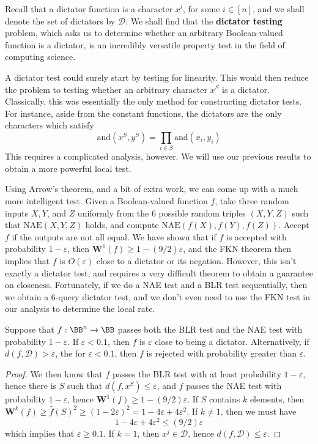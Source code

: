 Recall that a dictator function is a character $x^i$, for some $i \in [n]$, and we shall denote the set of dictators by $\mathcal{D}$. We shall find that the {\bf dictator testing} problem, which asks us to determine whether an arbitrary Boolean-valued function is a dictator, is an incredibly versatile property test in the field of computing science.

A dictator test could surely start by testing for linearity. This would then reduce the problem to testing whether an arbitrary character $x^S$ is a dictator. Classically, this was essentially the only method for constructing dictator tests. For instance, aside from the constant functions, the dictators are the only characters which satisfy
%
\[ \text{and}(x^S, y^S) = \prod_{i \in S} \text{and}(x_i,y_i) \]
%
This requires a complicated analysis, however. We will use our previous results to obtain a more powerful local test.

Using Arrow's theorem, and a bit of extra work, we can come up with a much more intelligent test. Given a Boolean-valued function $f$, take three random inputs $X,Y$, and $Z$ uniformly from the 6 possible random triples $(X,Y,Z)$ such that $\text{NAE}(X,Y,Z)$ holds, and compute $\text{NAE}(f(X),f(Y),f(Z))$. Accept $f$ if the outputs are not all equal. We have shown that if $f$ is accepted with probability $1 - \varepsilon$, then $\mathbf{W}^1(f) \geq 1 - (9/2) \varepsilon$, and the FKN theorem then implies that $f$ is $O(\varepsilon)$ close to a dictator or its negation. However, this isn't exactly a dictator test, and requires a very difficult theorem to obtain a guarantee on closeness. Fortunately, if we do a NAE test and a BLR test sequentially, then we obtain a 6-query dictator test, and we don't even need to use the FKN test in our analysis to determine the local rate.

\begin{theorem}
    Suppose that $f: \BB^n \to \BB$ passes both the BLR test and the NAE test with probability $1 - \varepsilon$. If $\varepsilon < 0.1$, then $f$ is $\varepsilon$ close to being a dictator. Alternatively, if $d(f,\mathcal{D}) > \varepsilon$, the for $\varepsilon < 0.1$, then $f$ is rejected with probability greater than $\varepsilon$.
\end{theorem}
\begin{proof}
    We then know that $f$ passes the BLR test with at least probability $1 - \varepsilon$, hence there is $S$ such that $d(f,x^S) \leq \varepsilon$, and $f$ passes the NAE test with probability $1 - \varepsilon$, hence $\mathbf{W}^1(f) \geq 1 - (9/2) \varepsilon$. If $S$ contains $k$ elements, then $\mathbf{W}^k(f) \geq \widehat{f}(S)^2 \geq (1 - 2\varepsilon)^2 = 1 - 4\varepsilon + 4\varepsilon^2$. If $k \neq 1$, then we must have
    \[ 1 - 4 \varepsilon + 4 \varepsilon^2 \leq (9/2) \varepsilon \]
    which implies that $\varepsilon \geq 0.1$. If $k = 1$, then $x^j \in \mathcal{D}$, hence $d(f,\mathcal{D}) \leq \varepsilon$.
\end{proof}


